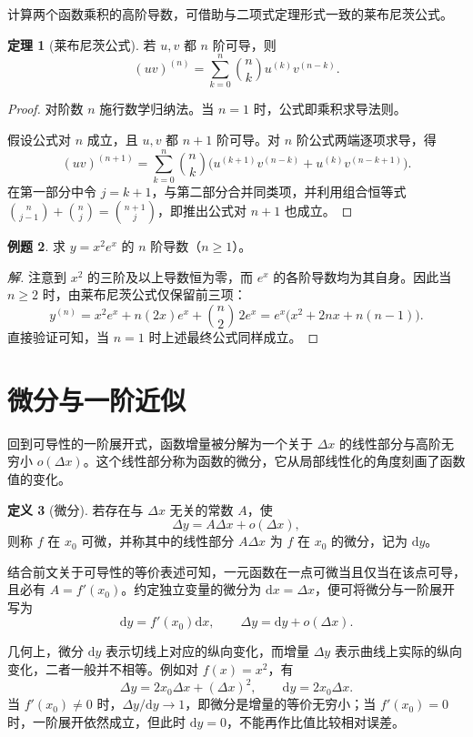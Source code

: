 \documentclass[UTF8,fontset=fandol,a4paper,12pt]{ctexart}
\newcommand{\dd}{\mathrm d}
\theoremstyle{definition}
\newtheorem{definition}{定义}[section]
\newtheorem{theorem}[definition]{定理}
\newtheorem{example}[definition]{例题}
\begin{document}
计算两个函数乘积的高阶导数，可借助与二项式定理形式一致的莱布尼茨公式。

\begin{theorem}[莱布尼茨公式]
若 $u,v$ 都 $n$ 阶可导，则
\[
 \boxed{(uv)^{(n)}=\sum_{k=0}^n\binom nk u^{(k)}v^{(n-k)}.}
\]
\end{theorem}
\begin{proof}
对阶数 $n$ 施行数学归纳法。当 $n=1$ 时，公式即乘积求导法则。

假设公式对 $n$ 成立，且 $u,v$ 都 $n+1$ 阶可导。对 $n$ 阶公式两端逐项求导，得
\[
 (uv)^{(n+1)}=\sum_{k=0}^n\binom nk
 \bigl(u^{(k+1)}v^{(n-k)}+u^{(k)}v^{(n-k+1)}\bigr).
\]
在第一部分中令 $j=k+1$，与第二部分合并同类项，并利用组合恒等式 $\binom n{j-1}+\binom nj=\binom{n+1}j$，即推出公式对 $n+1$ 也成立。
\end{proof}

\begin{example}
求 $y=x^2e^x$ 的 $n$ 阶导数（$n\ge1$）。
\end{example}
\begin{proof}[解]
注意到 $x^2$ 的三阶及以上导数恒为零，而 $e^x$ 的各阶导数均为其自身。因此当 $n\ge2$ 时，由莱布尼茨公式仅保留前三项：
\[
 y^{(n)}=x^2e^x+n(2x)e^x+\binom n2\,2e^x
 =e^x\bigl(x^2+2nx+n(n-1)\bigr).
\]
直接验证可知，当 $n=1$ 时上述最终公式同样成立。
\end{proof}

\section{微分与一阶近似}
回到可导性的一阶展开式，函数增量被分解为一个关于 $\Delta x$ 的线性部分与高阶无穷小 $o(\Delta x)$。这个线性部分称为函数的微分，它从局部线性化的角度刻画了函数值的变化。

\begin{definition}[微分]
若存在与 $\Delta x$ 无关的常数 $A$，使
\[
 \Delta y=A\Delta x+o(\Delta x),
\]
则称 $f$ 在 $x_0$ 可微，并称其中的线性部分 $A\Delta x$ 为 $f$ 在 $x_0$ 的微分，记为 $\dd y$。
\end{definition}

结合前文关于可导性的等价表述可知，一元函数在一点可微当且仅当在该点可导，且必有 $A=f'(x_0)$。约定独立变量的微分为 $\dd x=\Delta x$，便可将微分与一阶展开写为
\[
 \boxed{\dd y=f'(x_0)\dd x,\qquad
 \Delta y=\dd y+o(\Delta x).}
\]

几何上，微分 $\dd y$ 表示切线上对应的纵向变化，而增量 $\Delta y$ 表示曲线上实际的纵向变化，二者一般并不相等。例如对 $f(x)=x^2$，有
\[
 \Delta y=2x_0\Delta x+(\Delta x)^2,\qquad
 \dd y=2x_0\Delta x.
\]
当 $f'(x_0)\ne0$ 时，$\Delta y/\dd y\to1$，即微分是增量的等价无穷小；当 $f'(x_0)=0$ 时，一阶展开依然成立，但此时 $\dd y=0$，不能再作比值比较相对误差。
\end{document}

